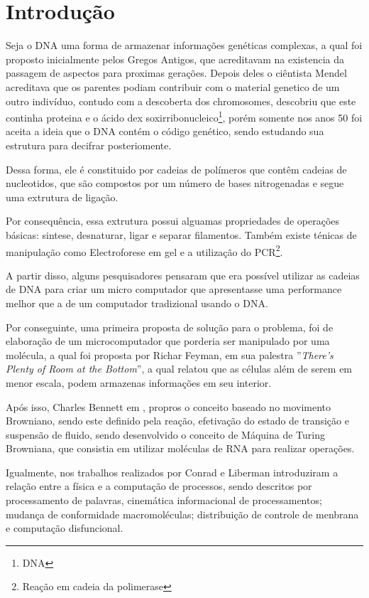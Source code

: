 \section*{Introdução}

    Seja o DNA uma forma de armazenar informações genéticas complexas, a 
qual foi proposto inicialmente pelos Gregos Antigos, que acreditavam na 
existencia da passagem de aspectos para proximas gerações. Depois deles 
o ciêntista Mendel acreditava que os parentes podiam contribuir com o
material genetico de um outro indivíduo, contudo com a descoberta 
dos chromosomes, descobriu que este continha proteina e o ácido dex
soxirribonucleico\footnote{DNA},
porém somente nos anos 50 foi aceita a ideia que o DNA contém o código genético,
sendo estudando sua estrutura para decifrar\cite{gibbons_1997} posteriomente.

    Dessa forma, ele é constituido por cadeias de polímeros que contêm 
cadeias de nucleotidos, que são compostos por um número de bases 
nitrogenadas e segue uma extrutura de ligação\cite{gibbons_1997}.

    Por consequência, essa extrutura possui alguamas propriedades de 
operações básicas: sintese, desnaturar, ligar e separar filamentos. 
Também existe ténicas de manipulação como Electroforese em gel e a
utilização do PCR\footnote{Reação em cadeia da polimerase}\@.

    A partir disso, alguns pesquisadores pensaram que era possível 
utilizar as cadeias de DNA para criar um micro computador que apresentasse
uma performance melhor que a de um computador tradizional usando o DNA\@\cite{conrad_1985_on}.
    
    Por conseguinte, uma primeira proposta de solução para o problema, foi de elaboração
de um microcomputador que porderia ser manipulado por uma molécula, a qual foi 
proposta por Richar Feyman, em  sua palestra ''\textit{There's Plenty of Room at the Bottom}'',
a qual relatou  que as células além de serem em menor escala, podem armazenas informações em
seu interior\cite{feynman_1992_theres}. 

    Após isso, Charles Bennett em \citeyear{bennett_1982_the}, propros o conceito baseado
no movimento Browniano, sendo este definido pela reação, efetivação do estado de transição
e suspensão de fluido, sendo desenvolvido o conceito de Máquina de Turing Browniana, que consistia
em utilizar moléculas de RNA para realizar operações.

    Igualmente, nos trabalhos realizados por Conrad e Liberman\citeyear{conrad_1982_molecular} introduziram a relação entre
a física e a computação de processos, sendo descritos por processamento de palavras, cinemática
informacional de processamentos; mudança de conformidade macromoléculas; distribuição
de controle de menbrana e computação disfuncional.


